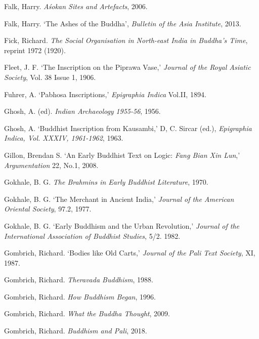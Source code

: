 \label{footprints_split_022.html_Falkux202006}
Falk, Harry. \emph{Aśokan Sites and Artefacts}, 2006.

\label{footprints_split_022.html_Falkux202013}
Falk, Harry. `The Ashes of the Buddha', \emph{Bulletin of the Asia
Institute}, 2013.

Fick, Richard. \emph{The Social Organisation in North-east India in
Buddha's Time}, reprint 1972 (1920).

\label{footprints_split_022.html_Fleetux201906}
Fleet, J. F. `The Inscription on the Piprawa Vase,' \emph{Journal of the
Royal Asiatic Society}, Vol. 38 Issue 1, 1906.

\label{footprints_split_022.html_Fuhrerux201894}
Fuhrer, A. `Pabhosa Inscriptions,' \emph{Epigraphia Indica} Vol.II,
1894.

\label{footprints_split_022.html_Ghoshux201956}
Ghosh, A. (ed). \emph{Indian Archaeology} \emph{1955-56}, 1956.

\label{footprints_split_022.html_Ghoshux201963}
Ghosh, A. `Buddhist Inscription from Kausambi,' D, C. Sircar (ed.),
\emph{Epigraphia Indica, Vol. XXXIV, 1961-1962}, 1963.

\label{footprints_split_022.html_Gillonux202008}
Gillon, Brendan S. `An Early Buddhist Text on Logic: \emph{Fang Bian Xin
Lun},' \emph{Argumentation} 22, No.1, 2008.

Gokhale, B. G. \emph{The Brahmins in Early Buddhist Literature}, 1970.

Gokhale, B. G. `The Merchant in Ancient India,' \emph{Journal of the
American Oriental Society}, 97.2, 1977.

Gokhale, B. G. `Early Buddhism and the Urban Revolution,' \emph{Journal
of the International Association of Buddhist Studies}, 5/2. 1982.

\label{footprints_split_022.html_Gombrichux201987}
Gombrich, Richard. `Bodies like Old Carts,' \emph{Journal of the Pali
Text Society}, XI, 1987.

Gombrich, Richard. \emph{Theravada Buddhism}, 1988.

\label{footprints_split_022.html_Gombrichux201996}
Gombrich, Richard. \emph{How Buddhism Began}, 1996.

\label{footprints_split_022.html_Gombrichux202009}
Gombrich, Richard. \emph{What the Buddha Thought}, 2009.

\label{footprints_split_022.html_Gombrichux202018}
Gombrich, Richard. \emph{Buddhism and Pali}, 2018.

